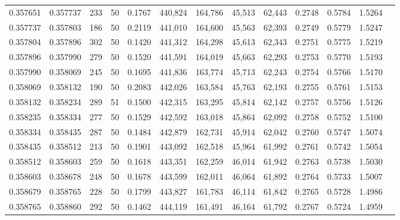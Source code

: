 \begin{tabular}{rrrrrrrrrrrrr}
0.357651 & 0.357737 &   233 &  50 &                                     0.1767 & 440,824 & 164,786 &  45,513 &  62,443 & 0.2748 & 0.5784 & 1.5264 \\
0.357737 & 0.357803 &   186 &  50 &                                     0.2119 & 441,010 & 164,600 &  45,563 &  62,393 & 0.2749 & 0.5779 & 1.5247 \\
0.357804 & 0.357896 &   302 &  50 &                                     0.1420 & 441,312 & 164,298 &  45,613 &  62,343 & 0.2751 & 0.5775 & 1.5219 \\
0.357896 & 0.357990 &   279 &  50 &                                     0.1520 & 441,591 & 164,019 &  45,663 &  62,293 & 0.2753 & 0.5770 & 1.5193 \\
0.357990 & 0.358069 &   245 &  50 &                                     0.1695 & 441,836 & 163,774 &  45,713 &  62,243 & 0.2754 & 0.5766 & 1.5170 \\
0.358069 & 0.358132 &   190 &  50 &                                     0.2083 & 442,026 & 163,584 &  45,763 &  62,193 & 0.2755 & 0.5761 & 1.5153 \\
0.358132 & 0.358234 &   289 &  51 &                                     0.1500 & 442,315 & 163,295 &  45,814 &  62,142 & 0.2757 & 0.5756 & 1.5126 \\
0.358235 & 0.358334 &   277 &  50 &                                     0.1529 & 442,592 & 163,018 &  45,864 &  62,092 & 0.2758 & 0.5752 & 1.5100 \\
0.358334 & 0.358435 &   287 &  50 &                                     0.1484 & 442,879 & 162,731 &  45,914 &  62,042 & 0.2760 & 0.5747 & 1.5074 \\
0.358435 & 0.358512 &   213 &  50 &                                     0.1901 & 443,092 & 162,518 &  45,964 &  61,992 & 0.2761 & 0.5742 & 1.5054 \\
0.358512 & 0.358603 &   259 &  50 &                                     0.1618 & 443,351 & 162,259 &  46,014 &  61,942 & 0.2763 & 0.5738 & 1.5030 \\
0.358603 & 0.358678 &   248 &  50 &                                     0.1678 & 443,599 & 162,011 &  46,064 &  61,892 & 0.2764 & 0.5733 & 1.5007 \\
0.358679 & 0.358765 &   228 &  50 &                                     0.1799 & 443,827 & 161,783 &  46,114 &  61,842 & 0.2765 & 0.5728 & 1.4986 \\
0.358765 & 0.358860 &   292 &  50 &                                     0.1462 & 444,119 & 161,491 &  46,164 &  61,792 & 0.2767 & 0.5724 & 1.4959 \\

\end{tabular}
